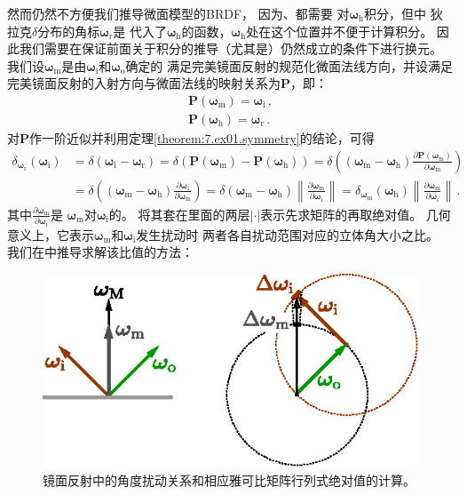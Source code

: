 然而仍然不方便我们推导微面模型的BRDF，
因为、都需要
对${\bm\omega}_{\mathrm{h}}$积分，但中
狄拉克$\delta$分布的角标${\bm\omega}_{\mathrm{r}}$是
代入了${\bm\omega}_{\mathrm{h}}$的函数，${\bm\omega}_{\mathrm{h}}$处在这个位置并不便于计算积分。
因此我们需要在保证前面关于积分的推导（尤其是）仍然成立的条件下进行换元。
我们设${\bm\omega}_{\mathrm{m}}$是由${\bm\omega}_{\mathrm{i}}$和${\bm\omega}_{\mathrm{o}}$确定的
满足完美镜面反射的规范化微面法线方向，并设满足完美镜面反射的入射方向与微面法线的映射关系为$\bm P$，即：
\begin{align}
    {\bm P}({\bm\omega}_{\mathrm{m}})={\bm\omega}_{\mathrm{i}}\, , \\
    {\bm P}({\bm\omega}_{\mathrm{h}})={\bm\omega}_{\mathrm{r}}\, .
\end{align}
对$\bm P$作一阶近似并利用定理\ref{theorem:7.ex01.symmetry}的结论，可得
\begin{align}\label{eq:08ex01-DeltaChangeVar}
    \delta_{{\bm\omega}_{\mathrm{r}}}({\bm\omega}_{\mathrm{i}})
     & =\delta({\bm\omega}_{\mathrm{i}}-{\bm\omega}_{\mathrm{r}})
    =\delta({\bm P}({\bm\omega}_{\mathrm{m}})-{\bm P}({\bm\omega}_{\mathrm{h}}))
    =\displaystyle\delta\left(({\bm\omega}_{\mathrm{m}}-{\bm\omega}_{\mathrm{h}})
    \frac{\partial{\bm P}({\bm\omega}_{\mathrm{m}})}{\partial{\bm\omega}_{\mathrm{m}}}\right)\nonumber \\
     & =\displaystyle\delta\left(({\bm\omega}_{\mathrm{m}}-{\bm\omega}_{\mathrm{h}})
    \frac{\partial{\bm\omega}_{\mathrm{i}}}{\partial{\bm\omega}_{\mathrm{m}}}\right)
    =\delta({\bm\omega}_{\mathrm{m}}-{\bm\omega}_{\mathrm{h}})
    \left\lVert\frac{\partial{\bm\omega}_{\mathrm{m}}}{\partial{\bm\omega}_{\mathrm{i}}}\right\rVert
    =\delta_{{\bm\omega}_{\mathrm{m}}}({\bm\omega}_{\mathrm{h}})
    \left\lVert\frac{\partial{\bm\omega}_{\mathrm{m}}}{\partial{\bm\omega}_{\mathrm{i}}}\right\rVert\, .
\end{align}
其中$\displaystyle\frac{\partial{\bm\omega}_{\mathrm{m}}}{\partial{\bm\omega}_{\mathrm{i}}}$是
${\bm\omega}_{\mathrm{m}}$对${\bm\omega}_{\mathrm{i}}$的。
将其套在里面的两层$|\cdot|$表示先求矩阵的再取绝对值。
几何意义上，它表示${\bm\omega}_{\mathrm{m}}$和${\bm\omega}_{\mathrm{i}}$发生扰动时
两者各自扰动范围对应的立体角大小之比。
我们在中推导求解该比值的方法：
\begin{figure}[htbp]
    \centering
    \includegraphics[width=0.6\linewidth]{Pictures/chap08/JacobianRefraction.eps}
    \caption{镜面反射中的角度扰动关系和相应雅可比矩阵行列式绝对值的计算。}
    \label{fig:08ex01-JacobianRefraction}
\end{figure}

